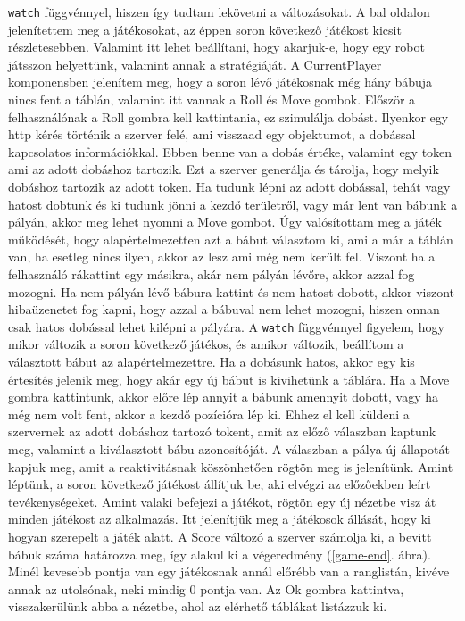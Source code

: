 \documentclass[a4paper,twoside]{article}
\begin{document}
\verb|watch| függvénnyel, hiszen így tudtam lekövetni a változásokat. A bal oldalon jelenítettem meg a játékosokat, az éppen soron következő játékost kicsit részletesebben. Valamint itt lehet beállítani, hogy akarjuk-e, hogy egy robot játsszon helyettünk, valamint annak a stratégiáját. A CurrentPlayer komponensben jelenítem meg, hogy a soron lévő játékosnak még hány bábuja nincs fent a táblán, valamint itt vannak a Roll és Move gombok. Először a felhasználónak a Roll gombra kell kattintania, ez szimulálja dobást. Ilyenkor egy http kérés történik a szerver felé, ami visszaad egy objektumot, a dobással kapcsolatos információkkal. Ebben benne van a dobás értéke, valamint egy token ami az adott dobáshoz tartozik. Ezt a szerver generálja és tárolja, hogy melyik dobáshoz tartozik az adott token. Ha tudunk lépni az adott dobással, tehát vagy hatost dobtunk és ki tudunk jönni a kezdő területről, vagy már lent van bábunk a pályán, akkor meg lehet nyomni a Move gombot. Úgy valósítottam meg a játék működését, hogy alapértelmezetten azt a bábut választom ki, ami a már a táblán van, ha esetleg nincs ilyen, akkor az lesz ami még nem került fel. Viszont ha a felhasználó rákattint egy másikra, akár nem pályán lévőre, akkor azzal fog mozogni. Ha nem pályán lévő bábura kattint és nem hatost dobott, akkor viszont hibaüzenetet fog kapni, hogy azzal a bábuval nem lehet mozogni, hiszen onnan csak hatos dobással lehet kilépni a pályára. A \verb|watch| függvénnyel figyelem, hogy mikor változik a soron következő játékos, és amikor változik, beállítom a választott bábut az alapértelmezettre. Ha a dobásunk hatos, akkor egy kis értesítés jelenik meg, hogy akár egy új bábut is kivihetünk a táblára.  Ha a Move gombra kattintunk, akkor előre lép annyit a bábunk amennyit dobott, vagy ha még nem volt fent, akkor a kezdő pozícióra lép ki. Ehhez el kell küldeni a szervernek az adott dobáshoz tartozó tokent, amit az előző válaszban kaptunk meg, valamint a kiválasztott bábu azonosítóját. A válaszban a pálya új állapotát kapjuk meg, amit a reaktivitásnak köszönhetően rögtön meg is jelenítünk. Amint léptünk, a soron következő játékost állítjuk be, aki elvégzi az előzőekben leírt tevékenységeket. Amint valaki befejezi a játékot, rögtön egy új nézetbe visz át minden játékost az alkalmazás. Itt jelenítjük meg a játékosok állását, hogy ki hogyan szerepelt a játék alatt. A Score változó a szerver számolja ki, a bevitt bábuk száma határozza meg, így alakul ki a végeredmény (\ref{game-end}. ábra). Minél kevesebb pontja van egy játékosnak annál előrébb van a ranglistán, kivéve annak az utolsónak, neki mindig 0 pontja van. Az Ok gombra kattintva, visszakerülünk abba a nézetbe, ahol az elérhető táblákat listázzuk ki. 
\end{document}
